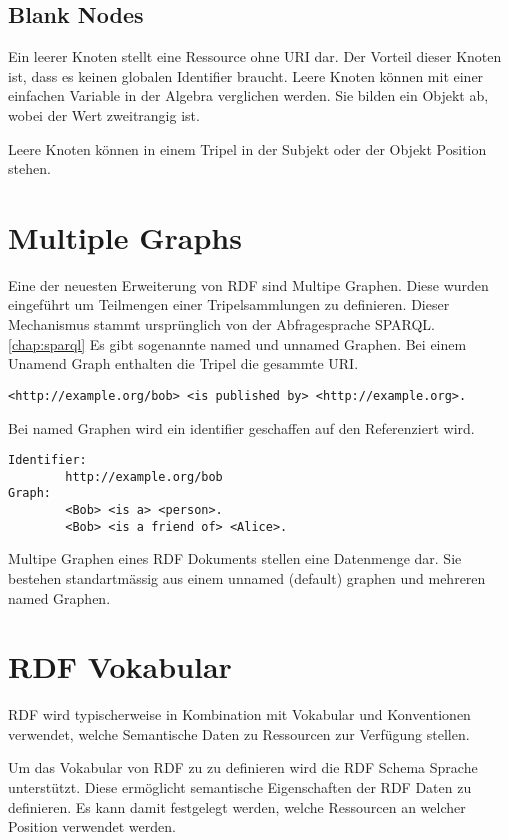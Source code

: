 \subsection{Blank Nodes}
\label{sec:rdf_rdf_dataModel_blankNodes}
Ein leerer Knoten stellt eine Ressource ohne URI dar. Der Vorteil dieser Knoten ist, dass es keinen globalen Identifier braucht. Leere Knoten können mit einer einfachen Variable in der Algebra verglichen werden. Sie bilden ein Objekt ab, wobei der Wert zweitrangig ist. 

\noindent\hspace*{15mm} Leere Knoten können in einem Tripel in der Subjekt oder der Objekt Position stehen.


\section{Multiple Graphs}
\label{sec:owlRdf_rdf_dataModel_multipleGraphs}

Eine der neuesten Erweiterung von RDF sind Multipe Graphen. Diese wurden eingeführt um Teilmengen einer Tripelsammlungen zu definieren. Dieser Mechanismus stammt ursprünglich von der Abfragesprache SPARQL.\ref{chap:sparql}
Es gibt sogenannte named und unnamed Graphen. 
Bei einem Unamend Graph enthalten die Tripel die gesammte URI.
\begin{lstlisting}[caption={Named graph}]
	<http://example.org/bob> <is published by> <http://example.org>.
\end{lstlisting}
Bei named Graphen wird ein identifier geschaffen auf den Referenziert wird. 
\begin{lstlisting}[caption={Named graph}]
Identifier: 
		http://example.org/bob
Graph:
		<Bob> <is a> <person>.
		<Bob> <is a friend of> <Alice>.
\end{lstlisting}
Multipe Graphen eines RDF Dokuments stellen eine Datenmenge dar. Sie bestehen standartmässig aus einem unnamed (default) graphen und mehreren named Graphen.


\section{RDF Vokabular}
\label{sec:rdf_rdf_voca}
RDF wird typischerweise in Kombination mit Vokabular und Konventionen verwendet, welche Semantische Daten zu Ressourcen zur Verfügung stellen.

Um das Vokabular von RDF zu zu definieren wird die RDF Schema Sprache unterstützt. Diese ermöglicht semantische Eigenschaften der RDF Daten zu definieren. Es kann damit festgelegt werden, welche Ressourcen an welcher Position verwendet werden.

